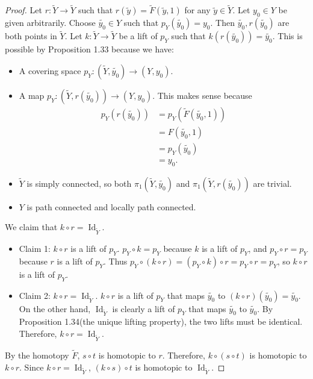 \documentclass[12pt, psamsfonts]{amsart}
\theoremstyle{definition}
\theoremstyle{remark}
\DeclareMathOperator{\Id}{Id}
\numberwithin{equation}{section}
\begin{document}
\begin{proof}
  Let $r: \tilde{Y} \rightarrow \tilde{Y}$ such that $r(\tilde{y}) = \tilde{F}(\tilde{y}, 1)$ for any $\tilde{y} \in \tilde{Y}$.
  Let $y_0 \in Y$ be given arbitrarily.
  Choose $\tilde{y_0} \in Y$ such that $p_Y(\tilde{y_0}) = y_0$.
  Then $\tilde{y_0}, r(\tilde{y_0})$ are both points in $\tilde{Y}$.
  Let $k: \tilde{Y} \rightarrow \tilde{Y}$ be a lift of $p_Y$ such that $k(r(\tilde{y_0})) = \tilde{y_0}$.  This is possible by Proposition 1.33 because we have:
  \begin{itemize}
    \item
      A covering space $p_Y: (\tilde{Y}, \tilde{y_0}) \rightarrow (Y, y_0)$.
    \item
      A map $p_Y: (\tilde{Y}, r(\tilde{y_0})) \rightarrow (Y, y_0)$.
      This makes sense because
      \begin{align*}
        p_Y(r(\tilde{y_0}))
          &= p_Y(\tilde{F}(\tilde{y_0}, 1)) \\
          &= F(\tilde{y_0}, 1) \\
          &= p_Y(\tilde{y_0}) \\
          &= y_0.
      \end{align*}
    \item
      $\tilde{Y}$ is simply connected, so both $\pi_1(\tilde{Y}, \tilde{y_0})$ and $\pi_1(\tilde{Y}, r(\tilde{y_0}))$ are trivial.
    \item
      $Y$ is path connected and locally path connected.
  \end{itemize}

  We claim that $k \circ r = \Id_{\tilde{Y}}$.
  \begin{itemize}
    \item
      Claim 1: $k \circ r$ is a lift of $p_Y$.
      $p_Y \circ k = p_Y$ because $k$ is a lift of $p_Y$, and $p_Y \circ r = p_Y$ because $r$ is a lift of $p_Y$.
      Thus $p_Y \circ (k \circ r) = (p_Y \circ k) \circ r = p_Y \circ r = p_Y$, so $k \circ r$ is a lift of $p_Y$.
    \item
      Claim 2: $k \circ r = \Id_{\tilde{Y}}$.
      $k \circ r$ is a lift of $p_Y$ that maps $\tilde{y_0}$ to $(k \circ r)(\tilde{y_0}) = \tilde{y_0}$.
      On the other hand, $\Id_{\tilde{Y}}$ is clearly a lift of $p_Y$ that maps $\tilde{y_0}$ to $\tilde{y_0}$.
      By Proposition 1.34(the unique lifting property), the two lifts must be identical.
      Therefore, $k \circ r = \Id_{\tilde{Y}}$.
  \end{itemize}

  By the homotopy $\tilde{F}$, $s \circ t$ is homotopic to $r$.
  Therefore, $k \circ (s \circ t)$ is homotopic to $k \circ r$.
  Since $k \circ r = \Id_{\tilde{Y}}$, $(k \circ s) \circ t$ is homotopic to $\Id_{\tilde{Y}}$.


\end{proof}
\end{document}
